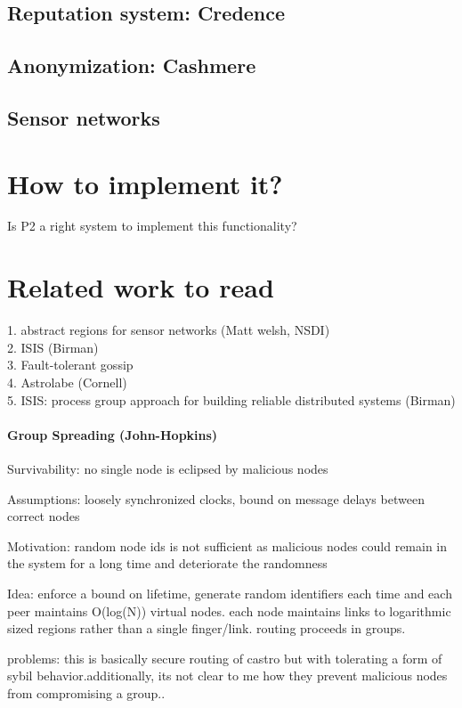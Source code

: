  
\subsection{Reputation system: Credence} 
 
\subsection{Anonymization: Cashmere}

\subsection{Sensor networks}

\fi

\section{How to implement it?} 
Is P2 a right system to implement this functionality? 
 
\section{Related work to read} 
1. abstract regions for sensor networks (Matt welsh, NSDI)\\ 
2. ISIS (Birman)\\ 
3. Fault-tolerant gossip\\ 
4. Astrolabe (Cornell) \\ 
5. ISIS: process group approach for building reliable distributed systems (Birman)\\ 
\paragraph{Group Spreading (John-Hopkins)}
Survivability: no single node is eclipsed by malicious nodes

Assumptions: loosely synchronized clocks, bound on message delays between correct nodes

Motivation: random node ids is not sufficient as malicious nodes could remain in the system for a long time and deteriorate the randomness

Idea: enforce a bound on lifetime, generate random identifiers each time and each peer maintains O(log(N)) virtual nodes. each node maintains links to logarithmic sized regions rather than a single finger/link. routing proceeds in groups.

problems: this is basically secure routing of castro but with tolerating a form of sybil behavior.additionally, its not clear to me how they prevent malicious nodes from compromising a group..


